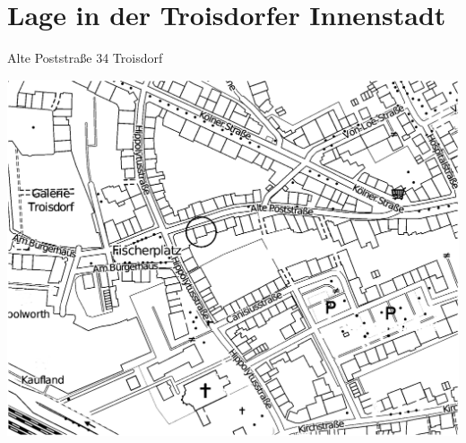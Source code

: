 \documentclass[a4paper,10pt,notumble]{leaflet}
\begin{document}
\newpage
\section*{Lage in der Troisdorfer Innenstadt}
Alte Poststraße 34 Troisdorf

\begin{center}
\includegraphics[width=\textwidth]{gfx/map/rect28239c}
\end{center}
\end{document}
